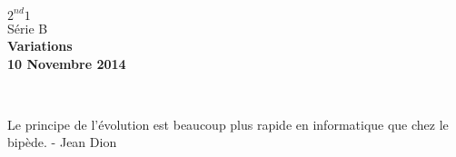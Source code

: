 \documentclass[10pt]{article}
\begin{document}

\begin{minipage}[t]{\textwidth}
  \raggedright
      {\bfseries $2^{nd}1$}\\[.35ex]
      Série B\\
      \vspace*{-1cm}
      \raggedleft
          {\bfseries Variations}\\[.35ex]
          {\bfseries 10 Novembre 2014}\\[.35ex]
\end{minipage}\\[1em]

\begin{center}
  \textsf{Le principe de l'évolution est beaucoup plus rapide en informatique que chez le bipède. - Jean Dion}\\
\end{center}

\setlength{\columnseprule}{1pt}
\end{document}
